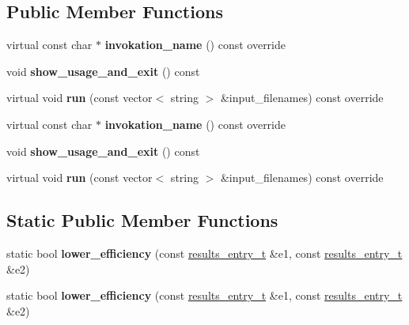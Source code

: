\subsection*{Public Member Functions}
\begin{DoxyCompactItemize}
\item 
\mbox{\label{structevaluate__defaults__action__t_afeb0afec95d47ed1637544c19a4bc56b}} 
virtual const char $\ast$ {\bfseries invokation\+\_\+name} () const override
\item 
\mbox{\label{structevaluate__defaults__action__t_a7822be8cab65b020ae93575e1ccc72ac}} 
void {\bfseries show\+\_\+usage\+\_\+and\+\_\+exit} () const
\item 
\mbox{\label{structevaluate__defaults__action__t_a5cd5ed28cdc8dac55bb7ae6810ad7d91}} 
virtual void {\bfseries run} (const vector$<$ string $>$ \&input\+\_\+filenames) const override
\item 
\mbox{\label{structevaluate__defaults__action__t_afeb0afec95d47ed1637544c19a4bc56b}} 
virtual const char $\ast$ {\bfseries invokation\+\_\+name} () const override
\item 
\mbox{\label{structevaluate__defaults__action__t_a7822be8cab65b020ae93575e1ccc72ac}} 
void {\bfseries show\+\_\+usage\+\_\+and\+\_\+exit} () const
\item 
\mbox{\label{structevaluate__defaults__action__t_a5cd5ed28cdc8dac55bb7ae6810ad7d91}} 
virtual void {\bfseries run} (const vector$<$ string $>$ \&input\+\_\+filenames) const override
\end{DoxyCompactItemize}
\subsection*{Static Public Member Functions}
\begin{DoxyCompactItemize}
\item 
\mbox{\label{structevaluate__defaults__action__t_abb9925fc7e6264fbaf3859910f4b179f}} 
static bool {\bfseries lower\+\_\+efficiency} (const \hyperlink{structevaluate__defaults__action__t_1_1results__entry__t}{results\+\_\+entry\+\_\+t} \&e1, const \hyperlink{structevaluate__defaults__action__t_1_1results__entry__t}{results\+\_\+entry\+\_\+t} \&e2)
\item 
\mbox{\label{structevaluate__defaults__action__t_abb9925fc7e6264fbaf3859910f4b179f}} 
static bool {\bfseries lower\+\_\+efficiency} (const \hyperlink{structevaluate__defaults__action__t_1_1results__entry__t}{results\+\_\+entry\+\_\+t} \&e1, const \hyperlink{structevaluate__defaults__action__t_1_1results__entry__t}{results\+\_\+entry\+\_\+t} \&e2)
\end{DoxyCompactItemize}
